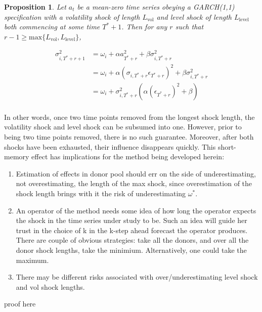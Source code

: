 \documentclass[11pt]{article}
\newtheorem{prop}{Proposition}
\theoremstyle{definition}
\newenvironment{proof-of-proposition}[1][{}]{\noindent{\bf
    Proof of Proposition {#1}}
  \hspace*{.5em}}{\qed\bigskip\\}
\begin{document}
\begin{prop}
Let $a_{t}$ be a mean-zero time series obeying a GARCH(1,1) specification with a volatility shock of length $L_{\text{vol}}$ and level shock of length $L_{\text{level}}$ both commencing at some time $T^{*}+1$.  Then for any $r$ such that $r-1 \geq \text{max}\{L_{\text{vol}},L_{\text{level}}\}$, 

\begin{align*}
\sigma^{2}_{i,T^{*}+r+1} & = \omega_{i} + \alpha a_{T^{*}+r}^{2} + \beta\sigma^{2}_{i,T^{*}+r} \\
& = \omega_{i} + \alpha(\sigma_{i,T^{*}+r}\epsilon_{T^{*}+r})^{2} + \beta\sigma^{2}_{i,T^{*}+r} \\
& = \omega_{i} + \sigma^{2}_{i,T^{*}+r}(\alpha (\epsilon_{T^{*}+r})^{2} + \beta)\\
\end{align*}
\end{prop}

In other words, once two time points removed from the longest shock length, the volatility shock and level shock can be subsumed into one.  However, prior to being two time points removed, there is no such guarantee.  Moreover, after both shocks have been exhausted, their influence disappears quickly.  This short-memory effect has implications for the method being developed herein:

\begin{enumerate}
\item Estimation of effects in donor pool should err on the side of underestimating, not overestimating, the length of the max shock, since overestimation of the shock length brings with it the risk of underestimating $\omega^{*}$.
\item An operator of the method needs some idea of how long the operator expects the shock in the time series under study to be.  Such an idea will guide her trust in the choice of k in the k-step ahead forecast the operator produces.  There are couple of obvious strategies: take all the donors, and over all the donor shock lengths, take the minimium.  Alternatively, one could take the maximum.
\item There may be different risks associated with over/underestimating level shock and vol shock lengths.
\end{enumerate}

\begin{proof-of-proposition}
proof here
\end{proof-of-proposition}
\end{document}
